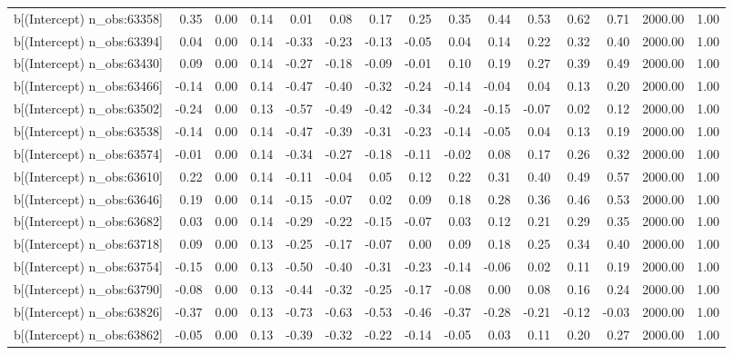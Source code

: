 \begin{table}[ht]
\begin{tabular}{rrrrrrrrrrrrrrr}
  b[(Intercept) n\_obs:63358] & 0.35 & 0.00 & 0.14 & 0.01 & 0.08 & 0.17 & 0.25 & 0.35 & 0.44 & 0.53 & 0.62 & 0.71 & 2000.00 & 1.00 \\ 
  b[(Intercept) n\_obs:63394] & 0.04 & 0.00 & 0.14 & -0.33 & -0.23 & -0.13 & -0.05 & 0.04 & 0.14 & 0.22 & 0.32 & 0.40 & 2000.00 & 1.00 \\ 
  b[(Intercept) n\_obs:63430] & 0.09 & 0.00 & 0.14 & -0.27 & -0.18 & -0.09 & -0.01 & 0.10 & 0.19 & 0.27 & 0.39 & 0.49 & 2000.00 & 1.00 \\ 
  b[(Intercept) n\_obs:63466] & -0.14 & 0.00 & 0.14 & -0.47 & -0.40 & -0.32 & -0.24 & -0.14 & -0.04 & 0.04 & 0.13 & 0.20 & 2000.00 & 1.00 \\ 
  b[(Intercept) n\_obs:63502] & -0.24 & 0.00 & 0.13 & -0.57 & -0.49 & -0.42 & -0.34 & -0.24 & -0.15 & -0.07 & 0.02 & 0.12 & 2000.00 & 1.00 \\ 
  b[(Intercept) n\_obs:63538] & -0.14 & 0.00 & 0.14 & -0.47 & -0.39 & -0.31 & -0.23 & -0.14 & -0.05 & 0.04 & 0.13 & 0.19 & 2000.00 & 1.00 \\ 
  b[(Intercept) n\_obs:63574] & -0.01 & 0.00 & 0.14 & -0.34 & -0.27 & -0.18 & -0.11 & -0.02 & 0.08 & 0.17 & 0.26 & 0.32 & 2000.00 & 1.00 \\ 
  b[(Intercept) n\_obs:63610] & 0.22 & 0.00 & 0.14 & -0.11 & -0.04 & 0.05 & 0.12 & 0.22 & 0.31 & 0.40 & 0.49 & 0.57 & 2000.00 & 1.00 \\ 
  b[(Intercept) n\_obs:63646] & 0.19 & 0.00 & 0.14 & -0.15 & -0.07 & 0.02 & 0.09 & 0.18 & 0.28 & 0.36 & 0.46 & 0.53 & 2000.00 & 1.00 \\ 
  b[(Intercept) n\_obs:63682] & 0.03 & 0.00 & 0.14 & -0.29 & -0.22 & -0.15 & -0.07 & 0.03 & 0.12 & 0.21 & 0.29 & 0.35 & 2000.00 & 1.00 \\ 
  b[(Intercept) n\_obs:63718] & 0.09 & 0.00 & 0.13 & -0.25 & -0.17 & -0.07 & 0.00 & 0.09 & 0.18 & 0.25 & 0.34 & 0.40 & 2000.00 & 1.00 \\ 
  b[(Intercept) n\_obs:63754] & -0.15 & 0.00 & 0.13 & -0.50 & -0.40 & -0.31 & -0.23 & -0.14 & -0.06 & 0.02 & 0.11 & 0.19 & 2000.00 & 1.00 \\ 
  b[(Intercept) n\_obs:63790] & -0.08 & 0.00 & 0.13 & -0.44 & -0.32 & -0.25 & -0.17 & -0.08 & 0.00 & 0.08 & 0.16 & 0.24 & 2000.00 & 1.00 \\ 
  b[(Intercept) n\_obs:63826] & -0.37 & 0.00 & 0.13 & -0.73 & -0.63 & -0.53 & -0.46 & -0.37 & -0.28 & -0.21 & -0.12 & -0.03 & 2000.00 & 1.00 \\ 
  b[(Intercept) n\_obs:63862] & -0.05 & 0.00 & 0.13 & -0.39 & -0.32 & -0.22 & -0.14 & -0.05 & 0.03 & 0.11 & 0.20 & 0.27 & 2000.00 & 1.00 \\ 

\end{tabular}
\end{table}
